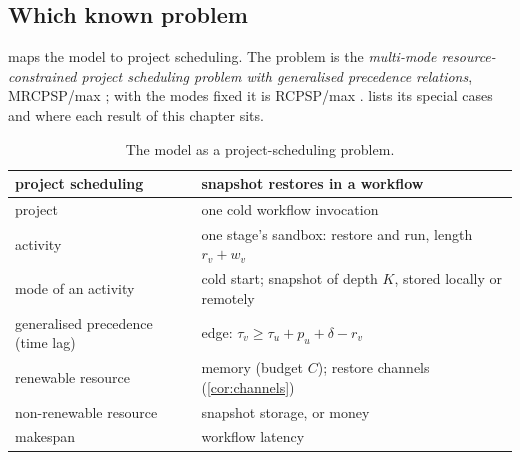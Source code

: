 \subsection{Which known problem}

 maps the model to project scheduling. The problem is the \emph{multi-mode
resource-constrained project scheduling problem with generalised precedence relations},
MRCPSP/max \cite{dereyck1999}; with the modes fixed it is RCPSP/max
\cite{bartusch1988,neumann2003}.  lists its special cases and where each result
of this chapter sits.

\begin{table}[t]
\centering
\caption{The model as a project-scheduling problem.}
\label{tab:rcpsp}
\small
\begin{tabular}{@{}ll@{}}
\toprule
project scheduling & snapshot restores in a workflow \\
\midrule
project & one cold workflow invocation \\
activity & one stage's sandbox: restore and run, length $r_v + w_v$ \\
mode of an activity & cold start; snapshot of depth $K$, stored locally or remotely \\
generalised precedence (time lag) & edge: $\tau_v \ge \tau_u + p_u + \delta - r_v$ \\
renewable resource & memory (budget $C$); restore channels (\cref{cor:channels}) \\
non-renewable resource & snapshot storage, or money \\
makespan & workflow latency \\
\bottomrule
\end{tabular}
\end{table}

